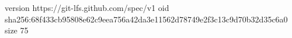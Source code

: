 version https://git-lfs.github.com/spec/v1
oid sha256:68f433cb95808e62c9eea756a42da3e11562d78749e2f3c13c9d70b32d35c6a0
size 75
